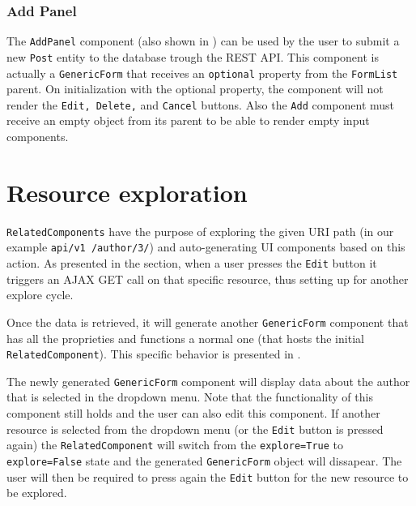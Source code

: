 \subsubsection{Add Panel}
\label{sec:add-panel}

The \texttt{AddPanel} component (also shown in ) can be used by the user to submit a new \texttt{Post} entity to the database trough the REST API. This component is actually a \texttt{GenericForm} that receives an \texttt{optional} property from the \texttt{FormList} parent. On initialization with the optional property, the component will not render the \texttt{Edit, Delete,} and \texttt{Cancel} buttons. Also the \texttt{Add} component must receive an empty object from its parent to be able to render empty input components.


\section{Resource exploration}
\label{sec:panel-nesting}

\texttt{RelatedComponents} have the purpose of exploring the given URI path (in our example \texttt{api/v1 /author/3/}) and auto-generating UI components based on this action. As presented in the  section, when a user presses the \texttt{Edit} button it triggers an AJAX GET call on that specific resource, thus setting up for another explore cycle.

Once the data is retrieved, it will generate another \texttt{GenericForm} component that has all the proprieties and functions a normal one (that hosts the initial \texttt{RelatedComponent}). This specific behavior is presented in .

The newly generated \texttt{GenericForm} component will display data about the author that is selected in the dropdown menu. Note that the functionality of this component still holds and the user can also edit this component. If another resource is selected from the dropdown menu (or the \texttt{Edit} button is pressed again) the \texttt{RelatedComponent} will switch from the \texttt{explore=True} to \texttt{explore=False} state and the generated \texttt{GenericForm} object will dissapear. The user will then be required to press again the \texttt{Edit} button for the new resource to be explored.


